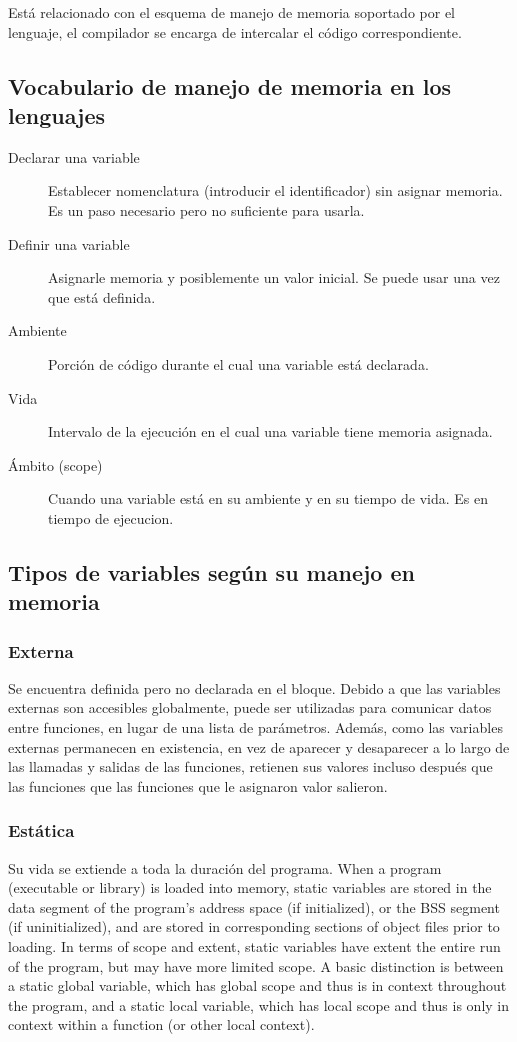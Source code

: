 \documentclass[a4paper, twoside]{article}
\begin{document}
Está relacionado con el esquema de manejo de memoria soportado por el lenguaje, el compilador se encarga de intercalar el código correspondiente.

\subsection{Vocabulario de manejo de memoria en los lenguajes}
\begin{description}
	\item[Declarar una variable] Establecer nomenclatura (introducir el identificador) sin asignar memoria. Es un paso necesario pero no suficiente para usarla.
	
	\item[Definir una variable] Asignarle memoria y posiblemente un valor inicial. Se puede usar una vez que está definida.
	
	\item[Ambiente] Porción de código durante el cual una variable está declarada.
	
	\item[Vida] Intervalo de la ejecución en el cual una variable tiene memoria asignada.
	
	\item[Ámbito (scope)] Cuando una variable está en su ambiente y en su tiempo de vida. Es en tiempo de ejecucion.
\end{description}

\subsection{Tipos de variables según su manejo en memoria}
\subsubsection{Externa}
Se encuentra definida pero no declarada en el bloque.
Debido a que las variables externas son accesibles globalmente, puede ser utilizadas para comunicar datos entre funciones, en lugar de una lista de parámetros.
Además, como las variables externas permanecen en existencia, en vez de aparecer y desaparecer a lo largo de las llamadas y salidas de las funciones, retienen sus valores incluso después que las funciones que las funciones que le asignaron valor salieron.

\subsubsection{Estática}
Su vida se extiende a toda la duración del programa.
When a program (executable or library) is loaded into memory, static variables are stored in the data segment of the program's address space (if initialized), or the BSS segment (if uninitialized), and are stored in corresponding sections of object files prior to loading.
In terms of scope and extent, static variables have extent the entire run of the program, but may have more limited scope. A basic distinction is between a static global variable, which has global scope and thus is in context throughout the program, and a static local variable, which has local scope and thus is only in context within a function (or other local context).
\end{document}
